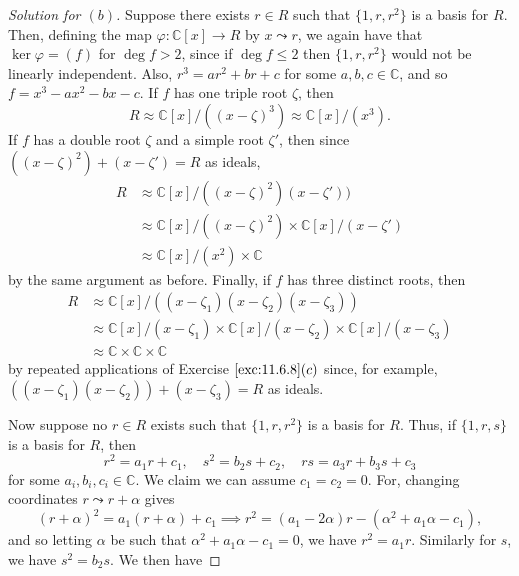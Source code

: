 \documentclass[12pt]{article}
\theoremstyle{remark}
\begin{document}
\begin{proof}[Solution for $(b)$]
  Suppose there exists $r \in R$ such that $\{1,r,r^2\}$ is a basis for $R$. Then, defining the map $\varphi\colon\mathbb{C}[x] \to R$ by $x \leadsto r$, we again have that $\ker\varphi = (f)$ for $\deg f > 2$, since if $\deg f \le 2$ then $\{1,r,r^2\}$ would not be linearly independent. Also, $r^3 = ar^2 + br + c$ for some $a,b,c\in\mathbb{C}$, and so $f = x^3 - ax^2 - bx - c$. If $f$ has one triple root $\zeta$, then
  \begin{equation*}
    R \approx \mathbb{C}[x]/((x-\zeta)^3) \approx \mathbb{C}[x]/(x^3).
  \end{equation*}
  If $f$ has a double root $\zeta$ and a simple root $\zeta'$, then since $((x-\zeta)^2) + (x-\zeta') = R$ as ideals,
  \begin{align*}
    R &\approx \mathbb{C}[x]/((x-\zeta)^2)(x-\zeta'))\\
    &\approx \mathbb{C}[x]/((x-\zeta)^2) \times \mathbb{C}[x]/(x-\zeta')\\
    &\approx \mathbb{C}[x]/(x^2) \times \mathbb{C}
  \end{align*}
  by the same argument as before. Finally, if $f$ has three distinct roots, then
  \begin{align*}
    R &\approx \mathbb{C}[x]/((x-\zeta_1)(x-\zeta_2)(x-\zeta_3))\\
    &\approx \mathbb{C}[x]/(x-\zeta_1) \times \mathbb{C}[x]/(x-\zeta_2) \times \mathbb{C}[x]/(x-\zeta_3)\\
    &\approx \mathbb{C} \times \mathbb{C} \times \mathbb{C}
  \end{align*}
  by repeated applications of Exercise $\ref{exc:11.6.8}(c)$ since, for example, $((x-\zeta_1)(x-\zeta_2)) + (x-\zeta_3) = R$ as ideals.
  \par Now suppose no $r \in R$ exists such that $\{1,r,r^2\}$ is a basis for $R$. Thus, if $\{1,r,s\}$ is a basis for $R$, then
  \begin{equation*}
    r^2 = a_1r + c_1, \quad s^2 = b_2s + c_2, \quad rs = a_3r + b_3s + c_3 
  \end{equation*}
  for some $a_i,b_i,c_i \in \mathbb{C}$. We claim we can assume $c_1=c_2=0$. For, changing coordinates $r \leadsto r + \alpha$ gives
  \begin{equation*}
    (r+\alpha)^2 = a_1(r+\alpha) + c_1 \implies r^2 = (a_1-2\alpha)r - (\alpha^2+a_1\alpha-c_1),
  \end{equation*}
  and so letting $\alpha$ be such that $\alpha^2 + a_1\alpha-c_1 = 0$, we have $r^2 = a_1r$. Similarly for $s$, we have $s^2 = b_2s$. We then have

\end{proof}
\end{document}

